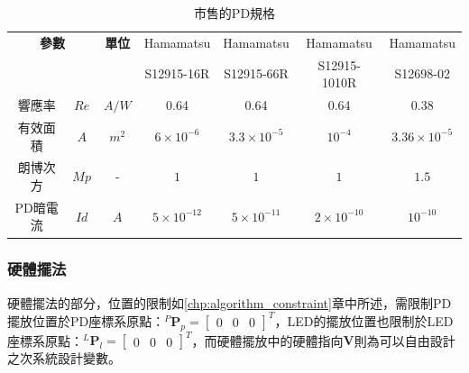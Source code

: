     \begin{table}[htpb]
            \renewcommand{\arraystretch}{1.3}
            \setlength{\arrayrulewidth}{0.15mm}
            \setlength{\doublerulesep}{0.12mm}
            \caption{市售的PD規格\cite{datasheet:hm_pd}}
            \label{tab:para_PD}
            \centering
            \begin{tabular}{|cc|c|| c|c|c|c|}
            \hline
            \multicolumn{2}{|c|}{\textbf{參數}} & \textbf{單位}  
            & {Hamamatsu}&{Hamamatsu} &{Hamamatsu} &{Hamamatsu}  \\
            \multicolumn{2}{|c|}{} & {}  
            & {S12915-16R}& {S12915-66R}& {S12915-1010R}& {S12698-02}
            \\
            \hline
            響應率 &$Re$ & $A/W$ & 0.64& 0.64& 0.64& 0.38 \\
            有效面積& $A$& $m^2$ & 
            $6\times 10^{-6}$ & 
            $3.3\times 10^{-5}$ & 
            $10^{-4}$ & 
            $3.36\times 10^{-5}$\\
            朗博次方& $Mp$& -  & $1$& $1$& $1$& $1.5$\\
            \hline
            PD暗電流 &$Id$ & $A$ 
            & $5\times 10^{-12}$ 
            & $5\times 10^{-11}$
            & $2\times 10^{-10}$
            & $10^{-10}$\\
            \hline
            \end{tabular}
    \end{table}
    

\subsubsection{硬體擺法}

硬體擺法的部分，位置的限制如\ref{chp:algorithm_constraint}章中所述，需限制PD擺放位置於PD座標系原點：$^P\boldsymbol{P}_p=
\left[\begin{array}{ccc}0&0&0\end{array}\right]^T$，LED的擺放位置也限制於LED座標系原點：$^L\boldsymbol{P}_l=
\left[\begin{array}{ccc}0&0&0\end{array}\right]^T$，而硬體擺放中的硬體指向$\boldsymbol{V}$則為可以自由設計之次系統設計變數。

